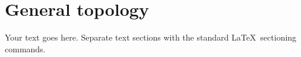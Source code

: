 %
%
%

\chapter{General topology}
\label{general_topology} %

Your text goes here. Separate text sections with the standard \LaTeX\
sectioning commands.
